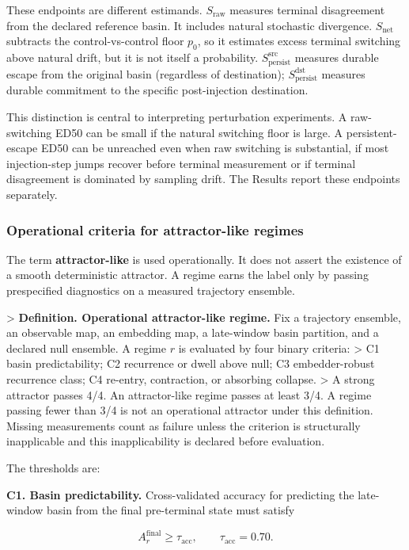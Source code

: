 \documentclass{article}
\theoremstyle{plain}
\theoremstyle{definition}
\begin{document}
These endpoints are different estimands. \(S_{\mathrm{raw}}\) measures terminal disagreement from the declared reference basin. It includes natural stochastic divergence. \(S_{\mathrm{net}}\) subtracts the control-vs-control floor \(p_0\), so it estimates excess terminal switching above natural drift, but it is not itself a probability. \(S_{\mathrm{persist}}^{\mathrm{src}}\) measures durable escape from the original basin (regardless of destination); \(S_{\mathrm{persist}}^{\mathrm{dst}}\) measures durable commitment to the specific post-injection destination.

This distinction is central to interpreting perturbation experiments. A raw-switching ED50 can be small if the natural switching floor is large. A persistent-escape ED50 can be unreached even when raw switching is substantial, if most injection-step jumps recover before terminal measurement or if terminal disagreement is dominated by sampling drift. The Results report these endpoints separately.

\subsubsection{Operational criteria for attractor-like regimes}

The term \textbf{attractor-like} is used operationally. It does not assert the existence of a smooth deterministic attractor. A regime earns the label only by passing prespecified diagnostics on a measured trajectory ensemble.

> \textbf{Definition. Operational attractor-like regime.} Fix a trajectory ensemble, an observable map, an embedding map, a late-window basin partition, and a declared null ensemble. A regime \(r\) is evaluated by four binary criteria:
> C1 basin predictability; C2 recurrence or dwell above null; C3 embedder-robust recurrence class; C4 re-entry, contraction, or absorbing collapse.
> A strong attractor passes 4/4. An attractor-like regime passes at least 3/4. A regime passing fewer than 3/4 is not an operational attractor under this definition. Missing measurements count as failure unless the criterion is structurally inapplicable and this inapplicability is declared before evaluation.

The thresholds are:

\textbf{C1. Basin predictability.} Cross-validated accuracy for predicting the late-window basin from the final pre-terminal state must satisfy

\[A_r^{\mathrm{final}} \ge \tau_{\mathrm{acc}},
\qquad
\tau_{\mathrm{acc}}=0.70.\]
\end{document}

